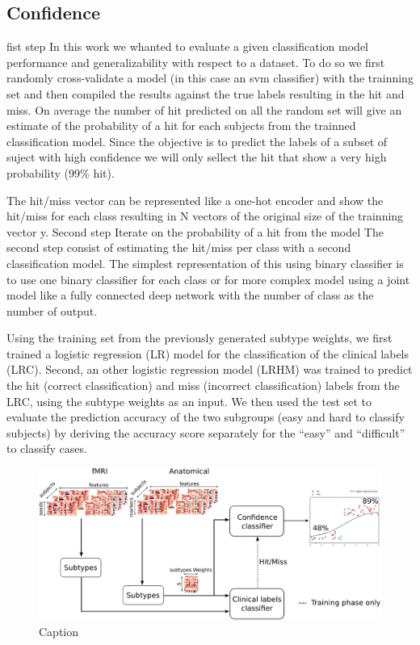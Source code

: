 \documentclass[authoryear]{elsarticle}
\begin{document}
\subsection{Confidence }


fist step
In this work we whanted to evaluate a given classification model performance and generalizability with respect to a dataset. To do so we first randomly cross-validate a model (in this case an svm classifier) with the trainning set and then compiled the results against the true labels resulting in the hit and miss. On average the number of hit predicted on all the random set will give an estimate of the probability of a hit for each subjects from the trainned classification model. Since the objective is to predict the labels of a subset of suject with high confidence we will only sellect the hit that show a very high probability (99\% hit).


The hit/miss vector can be represented like a one-hot encoder and show the hit/miss for each class resulting in N vectors of the original size of the trainning vector y.
Second step
Iterate on the probability of a hit from the model
The second step consist of estimating the hit/miss per class with a second classification model. The simplest representation of this using binary classifier is to use one binary classifier for each class or for more complex model using a joint model like a fully connected deep network with the number of class as the number of output.




Using the training set from the previously generated subtype weights, we first trained a logistic regression (LR) model \cite{Fan2008} for the classification of the clinical labels (LRC). Second, an other logistic regression model (LRHM) was trained to predict the hit (correct classification) and miss (incorrect classification) labels from the LRC, using the subtype weights as an input. We then used the test set to evaluate the prediction accuracy of the two subgroups (easy and hard to classify subjects) by deriving the accuracy score separately for the “easy” and “difficult” to classify cases.

\begin{figure}[tbp]
\centering
\includegraphics[width=\linewidth]{figures/full_model.png}
\caption{Caption}
\label{fig_model_schematic}
\end{figure}
\end{document}
